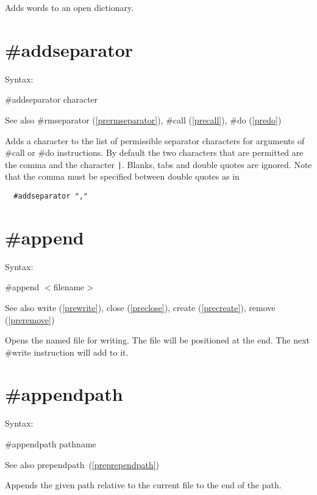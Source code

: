\noindent Adds words to an open dictionary.

 
\section{\#addseparator}
\label{preaddseparator}

\noindent Syntax:

\#addseparator character
 
\noindent See also \#rmseparator (\ref{prermseparator}),
            \#call (\ref{precall}), \#do (\ref{predo})

\noindent Adds a character to the list of permissible 
separator characters for arguments of \#call or \#do instructions. By 
default the two characters that are permitted are the comma and the 
character \verb:|:. Blanks, tabs and double quotes are ignored. Note that 
the comma must be specified between double quotes as in
\begin{verbatim}
  #addseparator ","
\end{verbatim}


 
\section{\#append}
\label{preappend}

\noindent Syntax:

\#append $<$filename$>$
 
\noindent See also write (\ref{prewrite}),
            close (\ref{preclose}), create (\ref{precreate}),
            remove (\ref{preremove})

\noindent Opens the named file for writing. The file will 
be positioned at the end. The next \#write instruction will 
add to it.

 
\section{\#appendpath}
\label{preappendpath}

\noindent Syntax:

\#appendpath pathname

\noindent See also prependpath~(\ref{preprependpath})

\noindent Appends the given path relative to the current file to the end of
the \FORM{} path.

